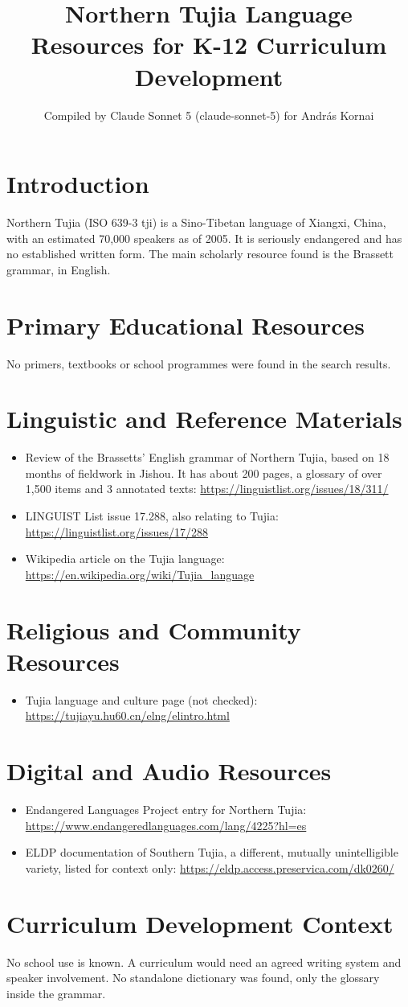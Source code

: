 \documentclass[12pt]{article}
\title{Northern Tujia Language Resources for K-12 Curriculum Development}
\author{Compiled by Claude Sonnet 5 (claude-sonnet-5) for Andr\'as Kornai}
\date{}
\begin{document}
\maketitle
\section{Introduction}
Northern Tujia (ISO 639-3 tji) is a Sino-Tibetan language of Xiangxi, China, with an estimated 70,000 speakers as of 2005. It is seriously endangered and has no established written form. The main scholarly resource found is the Brassett grammar, in English.
\section{Primary Educational Resources}
No primers, textbooks or school programmes were found in the search results.
\section{Linguistic and Reference Materials}
\begin{itemize}
\item Review of the Brassetts' English grammar of Northern Tujia, based on 18 months of fieldwork in Jishou. It has about 200 pages, a glossary of over 1,500 items and 3 annotated texts: \url{https://linguistlist.org/issues/18/311/}
\item LINGUIST List issue 17.288, also relating to Tujia: \url{https://linguistlist.org/issues/17/288}
\item Wikipedia article on the Tujia language: \url{https://en.wikipedia.org/wiki/Tujia_language}
\end{itemize}
\section{Religious and Community Resources}
\begin{itemize}
\item Tujia language and culture page (not checked): \url{https://tujiayu.hu60.cn/elng/elintro.html}
\end{itemize}
\section{Digital and Audio Resources}
\begin{itemize}
\item Endangered Languages Project entry for Northern Tujia: \url{https://www.endangeredlanguages.com/lang/4225?hl=es}
\item ELDP documentation of Southern Tujia, a different, mutually unintelligible variety, listed for context only: \url{https://eldp.access.preservica.com/dk0260/}
\end{itemize}
\section{Curriculum Development Context}
No school use is known. A curriculum would need an agreed writing system and speaker involvement. No standalone dictionary was found, only the glossary inside the grammar.
\end{document}
